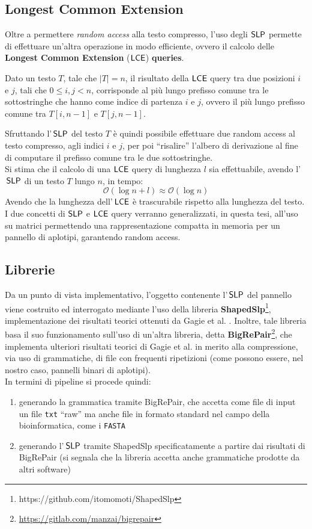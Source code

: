 \subsection{Longest Common Extension}
Oltre a permettere \textit{random access} alla testo compresso, 
l'uso degli $\mbox{\rm {\sf SLP}}$ permette di effettuare 
un'altra operazione in modo efficiente, ovvero il calcolo delle \textbf{Longest
  Common Extension} ($\mbox{\rm {\sf LCE}}$) \textbf{queries}.
\begin{definizione}
  Dato un testo $T$, tale che $|T|=n$, il risultato della $\mbox{\rm {\sf LCE}}$ query tra
  due posizioni $i$ e $j$, tali che $0\leq i,j<n$, corrisponde al più lungo
  prefisso comune tra le sottostringhe che hanno come indice di partenza $i$ e
  $j$, ovvero il più lungo prefisso comune tra $T[i,n-1]$ e $T[j,n-1]$.
\end{definizione}
Sfruttando l'$\,\mbox{\rm {\sf SLP}}$ del testo $T$ è quindi possibile effettuare due
random access al testo compresso, agli indici $i$ e $j$, per poi ``risalire''
l'albero di derivazione al fine di computare il prefisso comune tra le due
sottostringhe.\\ 
Si stima che il calcolo di una $\mbox{\rm {\sf LCE}}$ query di lunghezza $l$ sia
effettuabile, avendo l'$\,\mbox{\rm {\sf SLP}}$ di un testo $T$ lungo $n$, in tempo: 
\begin{equation}
  \label{eq:lcetime}
  \mathcal{O}\left(\log n+l\right)\approx\mathcal{O}\left(\log n\right)
\end{equation}
Avendo che la lunghezza dell'$\,\mbox{\rm {\sf LCE}}$ è trascurabile rispetto alla lunghezza del
testo.\\ 
I due concetti di $\mbox{\rm {\sf SLP}}$ e $\mbox{\rm {\sf LCE}}$ query verranno generalizzati, in
questa tesi, all'uso su matrici permettendo una rappresentazione compatta in
memoria per un pannello di aplotipi, garantendo random access.
\subsection{Librerie}
Da un punto di vista implementativo, l'oggetto contenente  l'$\,\mbox{\rm {\sf SLP}}$ del
pannello viene costruito ed interrogato mediante l'uso della libreria
\textbf{ShapedSlp}\footnote{https://github.com/itomomoti/ShapedSlp},
implementazione dei risultati teorici ottenuti da 
Gagie et al. \cite{slpgagie}. Inoltre, tale libreria basa il suo funzionamento
sull'uso di un'altra libreria, detta
\textbf{BigRePair}\footnote{\url{https://gitlab.com/manzai/bigrepair}}, che 
implementa ulteriori risultati teorici di Gagie et al. \cite{rpair} in merito
alla compressione, via uso di grammatiche, di file con frequenti ripetizioni
(come possono essere, nel nostro caso, pannelli binari di aplotipi).\\
In termini di pipeline si procede quindi:
\begin{enumerate}
  \item generando la grammatica tramite BigRePair, che accetta
  come file di input un file \texttt{txt} ``raw'' ma anche file in formato
  standard nel campo della bioinformatica, come i \texttt{FASTA}
  \item generando l'$\,\mbox{\rm {\sf SLP}}$ tramite ShapedSlp specificatamente a
  partire dai risultati di BigRePair (si segnala che la libreria
  accetta anche grammatiche prodotte da altri software) 
\end{enumerate}